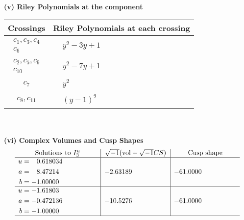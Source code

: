 \documentclass[1p]{elsarticle_modified}
\theoremstyle{definition}
\newcommand{\I}{\sqrt{-1}}
\begin{document}
\newpage\renewcommand{\arraystretch}{1}
\flushleft \textbf{(v) Riley Polynomials at the component}\newline \\
\begin{tabular}{m{50pt}|m{274pt}}
Crossings & \hspace{64pt}Riley Polynomials at each crossing \\
\hline $$\begin{aligned}c_{1},c_{3},c_{4}\\c_{6}\end{aligned}$$&$\begin{aligned}
&y^2-3 y+1
\end{aligned}$\\
\hline $$\begin{aligned}c_{2},c_{5},c_{9}\\c_{10}\end{aligned}$$&$\begin{aligned}
&y^2-7 y+1
\end{aligned}$\\
\hline $$\begin{aligned}c_{7}\end{aligned}$$&$\begin{aligned}
&y^2
\end{aligned}$\\
\hline $$\begin{aligned}c_{8},c_{11}\end{aligned}$$&$\begin{aligned}
&(y-1)^2
\end{aligned}$\\
\hline
\end{tabular}\\~\\
\newpage\flushleft \textbf{(vi) Complex Volumes and Cusp Shapes}
$$\begin{array}{c|c|c}  
\text{Solutions to }I^u_{3}& \I (\text{vol} + \sqrt{-1}CS) & \text{Cusp shape}\\
 \hline 
\begin{aligned}
u &= \phantom{-}0.618034\phantom{ +0.000000I} \\
a &= \phantom{-}8.47214\phantom{ +0.000000I} \\
b &= -1.00000\phantom{ +0.000000I}\end{aligned}
 & -2.63189\phantom{ +0.000000I} & -61.0000\phantom{ +0.000000I} \\ \hline\begin{aligned}
u &= -1.61803\phantom{ +0.000000I} \\
a &= -0.472136\phantom{ +0.000000I} \\
b &= -1.00000\phantom{ +0.000000I}\end{aligned}
 & -10.5276\phantom{ +0.000000I} & -61.0000\phantom{ +0.000000I}\\
 \hline 
 \end{array}$$\newpage
\end{document}
